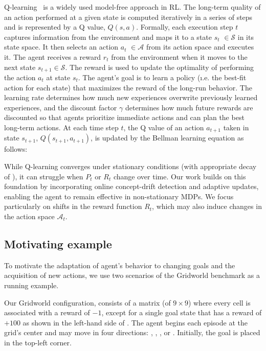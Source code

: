 Q-learning~\cite{watkins92} is a widely used model-free approach in \ac{RL}. The long-term quality of an action performed at a given state is computed iteratively in a series of steps and is represented by a Q value,
$\mathit{Q(s,a)}$.
Formally, each execution step $t$ captures information from the environment and maps it to a state
{\color{purple}$s_t$} $\in \mathcal{S}$ in its state space. It then selects an
action {\color{purple}$a_t$} $\in \mathcal{A}$ from its action space and executes it. The agent
receives a reward {\color{Bittersweet}$r_t$} from the environment when it moves to the next state
$s_{t+1} \in \mathcal{S}$. The reward is used to update the optimality of performing the
action {\color{Mulberry}$a_t$} at state {\color{purple}$s_t$}. The agent's goal is to learn
a policy (\i.e. the best-fit action for each state) that maximizes the reward of the
long-run behavior. The learning rate \lrate{\alpha} determines how much new experiences 
overwrite previously learned experiences, and the discount factor {\color{RoyalBlue} $\gamma$} 
determines how much future rewards are discounted so that agents prioritize immediate actions and 
can plan the best long-term actions. At each time step $t$, the Q value of an action 
{\color{purple}$a_{t+1}$} taken in state {\color{purple}$s_{t+1}$}, $Q(s_{t+1}, a_{t+1})$, is updated by 
the Bellman learning equation as follows:

\vspace{1em}

\vspace{1em}

While Q-learning converges under stationary conditions (with appropriate decay of \lrate{\alpha}), it 
can struggle when $P_t$ or $R_t$ change over time. Our work builds on this foundation by 
incorporating online concept-drift detection and adaptive updates, enabling the agent to remain 
effective in non-stationary MDPs. We focus particularly on shifts in the reward function $R_t$, which 
may also induce changes in the action space $\mathcal{A}_t$.


\subsection{Motivating example}
\label{sec:motivation}


To motivate the adaptation of agent's behavior to changing goals and the acquisition of new actions, 
we use two scenarios of the Gridworld benchmark as a running example.

Our Gridworld configuration, consists of a matrix (of $9\times 9$) where every cell is 
associated with a reward of $-1$, except for a single goal state that has a reward of $+100$ as shown 
in the left-hand side of . The agent begins each episode at the grid's center and may 
move in four directions: , , , or . Initially, the goal is placed in the 
top-left corner.  

